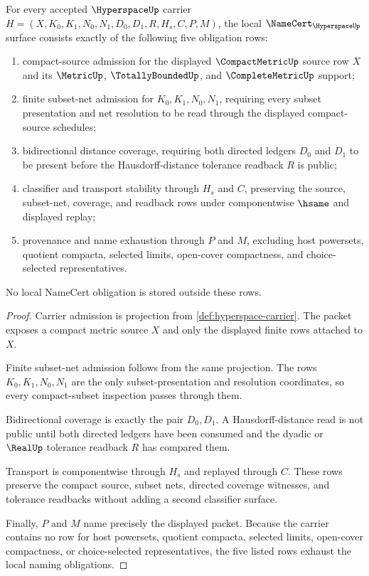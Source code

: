 \begin{theorem}
\label{thm:hyperspace-namecert-obligations}
For every accepted $\HyperspaceUp$ carrier $H=(X,K_0,K_1,N_0,N_1,D_0,D_1,R,H_s,C,P,M)$, the local $\NameCert_{\HyperspaceUp}$ surface consists exactly of the following five obligation rows:
\begin{enumerate}
\item compact-source admission for the displayed $\CompactMetricUp$ source row $X$ and its $\MetricUp$, $\TotallyBoundedUp$, and $\CompleteMetricUp$ support;
\item finite subset-net admission for $K_0,K_1,N_0,N_1$, requiring every subset presentation and net resolution to be read through the displayed compact-source schedules;
\item bidirectional distance coverage, requiring both directed ledgers $D_0$ and $D_1$ to be present before the Hausdorff-distance tolerance readback $R$ is public;
\item classifier and transport stability through $H_s$ and $C$, preserving the source, subset-net, coverage, and readback rows under componentwise $\hsame$ and displayed replay;
\item provenance and name exhaustion through $P$ and $M$, excluding host powersets, quotient compacta, selected limits, open-cover compactness, and choice-selected representatives.
\end{enumerate}
No local NameCert obligation is stored outside these rows.
\end{theorem}
\begin{proof}
Carrier admission is projection from \autoref{def:hyperspace-carrier}. The packet exposes a compact metric source $X$ and only the displayed finite rows attached to $X$.

Finite subset-net admission follows from the same projection. The rows $K_0,K_1,N_0,N_1$ are the only subset-presentation and resolution coordinates, so every compact-subset inspection passes through them.

Bidirectional coverage is exactly the pair $D_0,D_1$. A Hausdorff-distance read is not public until both directed ledgers have been consumed and the dyadic or $\RealUp$ tolerance readback $R$ has compared them.

Transport is componentwise through $H_s$ and replayed through $C$. These rows preserve the compact source, subset nets, directed coverage witnesses, and tolerance readbacks without adding a second classifier surface.

Finally, $P$ and $M$ name precisely the displayed packet. Because the carrier contains no row for host powersets, quotient compacta, selected limits, open-cover compactness, or choice-selected representatives, the five listed rows exhaust the local naming obligations.
\end{proof}

